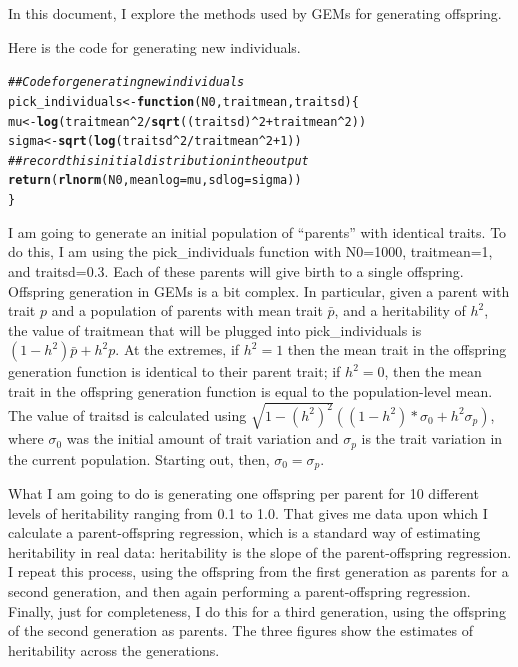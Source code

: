 \documentclass[12pt,reqno,final,pdftex]{amsart}\usepackage[]{graphicx}\usepackage[]{color}
\makeatletter
\newcommand{\hlnum}[1]{\textcolor[rgb]{0.686,0.059,0.569}{#1}}%
\newcommand{\hlcom}[1]{\textcolor[rgb]{0.678,0.584,0.686}{\textit{#1}}}%
\newcommand{\hlopt}[1]{\textcolor[rgb]{0,0,0}{#1}}%
\newcommand{\hlstd}[1]{\textcolor[rgb]{0.345,0.345,0.345}{#1}}%
\newcommand{\hlkwa}[1]{\textcolor[rgb]{0.161,0.373,0.58}{\textbf{#1}}}%
\newcommand{\hlkwb}[1]{\textcolor[rgb]{0.69,0.353,0.396}{#1}}%
\newcommand{\hlkwc}[1]{\textcolor[rgb]{0.333,0.667,0.333}{#1}}%
\newcommand{\hlkwd}[1]{\textcolor[rgb]{0.737,0.353,0.396}{\textbf{#1}}}%
\newenvironment{kframe}{%
 \def\at@end@of@kframe{}%
 \ifinner\ifhmode%
  \def\at@end@of@kframe{\end{minipage}}%
  \begin{minipage}{\columnwidth}%
 \fi\fi%
 \def\FrameCommand##1{\hskip\@totalleftmargin \hskip-\fboxsep
 \colorbox{shadecolor}{##1}\hskip-\fboxsep
     \hskip-\linewidth \hskip-\@totalleftmargin \hskip\columnwidth}%
 \MakeFramed {\advance\hsize-\width
   \@totalleftmargin\z@ \linewidth\hsize
   \@setminipage}}%
 {\par\unskip\endMakeFramed%
 \at@end@of@kframe}
\newenvironment{knitrout}{}{} %
\theoremstyle{plain}
\numberwithin{equation}{part}
\makeatother
\begin{document}
In this document, I explore the methods used by GEMs for generating offspring.

Here is the code for generating new individuals.
\begin{knitrout}\scriptsize
{}\color{fgcolor}\begin{kframe}
\begin{alltt}
\hlcom{## Code for generating new individuals}
\hlstd{pick_individuals} \hlkwb{<-} \hlkwa{function}\hlstd{(}\hlkwc{N0}\hlstd{,} \hlkwc{traitmean}\hlstd{,} \hlkwc{traitsd}\hlstd{) \{}
    \hlstd{mu} \hlkwb{<-} \hlkwd{log}\hlstd{(traitmean}\hlopt{^}\hlnum{2} \hlopt{/} \hlkwd{sqrt}\hlstd{((traitsd)}\hlopt{^}\hlnum{2}\hlopt{+}\hlstd{traitmean}\hlopt{^}\hlnum{2}\hlstd{))}
    \hlstd{sigma} \hlkwb{<-} \hlkwd{sqrt}\hlstd{(}\hlkwd{log}\hlstd{(traitsd}\hlopt{^}\hlnum{2}\hlopt{/}\hlstd{traitmean}\hlopt{^}\hlnum{2} \hlopt{+} \hlnum{1}\hlstd{))}
    \hlcom{## record this initial distribution in the output}
    \hlkwd{return}\hlstd{(}\hlkwd{rlnorm}\hlstd{(N0,} \hlkwc{meanlog}\hlstd{=mu,} \hlkwc{sdlog}\hlstd{=sigma))}
\hlstd{\}}
\end{alltt}
\end{kframe}
\end{knitrout}

I am going to generate an initial population of ``parents'' with identical traits. 
To do this, I am using the pick\_individuals function with N0=1000, traitmean=1, and traitsd=0.3.
Each of these parents will give birth to a single offspring.
Offspring generation in GEMs is a bit complex. 
In particular, given a parent with trait $p$ and a population of parents with mean trait $\bar{p}$, and a heritability of $h^2$, the value of traitmean that will be plugged into pick\_individuals is $(1-h^2)\bar{p} + h^2p$.
At the extremes, if $h^2=1$ then the mean trait in the offspring generation function is identical to their parent trait; if $h^2=0$, then the mean trait in the offspring generation function is equal to the population-level mean.
The value of traitsd is calculated using $\sqrt{1-(h^2)^2}\left((1-h^2)*\sigma_0 + h^2\sigma_p\right)$, where $\sigma_0$ was the initial amount of trait variation and $\sigma_p$ is the trait variation in the current population.
Starting out, then, $\sigma_0 = \sigma_p$. 

What I am going to do is generating one offspring per parent for 10 different levels of heritability ranging from 0.1 to 1.0. 
That gives me data upon which I calculate a parent-offspring regression, which is a standard way of estimating heritability in real data: heritability is the slope of the parent-offspring regression.
I repeat this process, using the offspring from the first generation as parents for a second generation, and then again performing a parent-offspring regression.
Finally, just for completeness, I do this for a third generation, using the offspring of the second generation as parents.
The three figures show the estimates of heritability across the generations.
\end{document}
